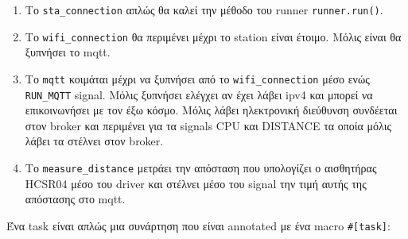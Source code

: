 \begin{enumerate}
  \item Το \verb|sta_connection| απλώς θα καλεί την μέθοδο του runner \verb|runner.run()|.
  \item Το \verb|wifi_connection| θα περιμένει μέχρι το station είναι έτοιμο. Μόλις είναι θα ξυπνήσει το mqtt.
  \item Το \verb|mqtt| κοιμάται μέχρι να ξυπνήσει από το \verb|wifi_connection| μέσο ενώς \verb|RUN_MQTT| signal.
    Μόλις ξυπνήσει ελέγχει αν έχει λάβει ipv4 και μπορεί να επικοινωνήσει με τον έξω κόσμο.
    Μόλις λάβει ηλεκτρονική διεύθυνση συνδέεται στον broker και περιμένει για τα signals CPU και DISTANCE τα οποία μόλις
    λάβει τα στέλνει στον broker.
  \item Το \verb|measure_distance| μετράει την απόσταση που υπολογίζει ο αισθητήρας HCSR04 μέσο του driver και στέλνει μέσο
    του signal την τιμή αυτής της απόστασης στο mqtt.    
\end{enumerate}

Ένα task είναι απλώς μια συνάρτηση που είναι annotated με ένα macro \verb|#[task]|:

